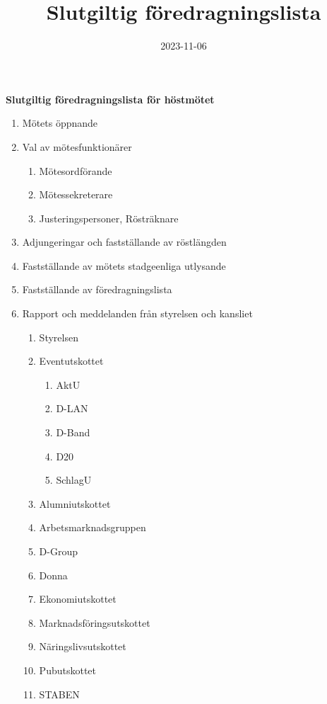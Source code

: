 \documentclass{datateknologsektionen-document}
\title{Slutgiltig föredragningslista}
\date{2023-11-06}
\begin{document}
\large
\begin{center}
  {\LARGE\bfseries Slutgiltig föredragningslista för höstmötet}
  \vspace{2mm}
\end{center}

\Large
\begin{enumerate}[topsep=0pt,itemsep=1ex]
  \item Mötets öppnande
  \item Val av mötesfunktionärer
        \begin{enumerate}[label*=\arabic*.,leftmargin=3em]
          \item Mötesordförande
          \item Mötessekreterare
          \item Justeringspersoner, Rösträknare
        \end{enumerate}
  \item Adjungeringar och fastställande av röstlängden
  \item Fastställande av mötets stadgeenliga utlysande
  \item Fastställande av föredragningslista
  \item Rapport och meddelanden från styrelsen och kansliet
        \begin{enumerate}[label*=\arabic*.,leftmargin=3em]
          \item Styrelsen
          \item Eventutskottet
            \begin{enumerate}[label*=\arabic*.,leftmargin=2em]
                \item AktU
                \item D-LAN
                \item D-Band
                \item D20
                \item SchlagU
            \end{enumerate}
          \item Alumniutskottet
          \item Arbetsmarknadsgruppen
          \item D-Group
          \item Donna
          \item Ekonomiutskottet
          \item Marknadsföringsutskottet
          \item Näringslivsutskottet
          \item Pubutskottet
          \item STABEN

\end{enumerate}
\end{enumerate}
\end{document}
